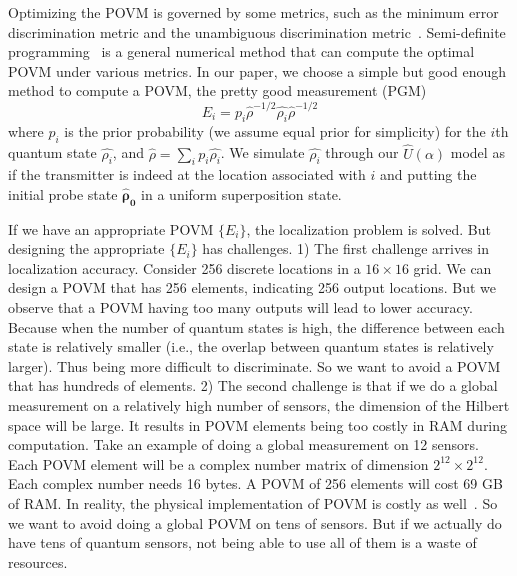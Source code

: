 Optimizing the POVM is governed by some metrics, such as the minimum error discrimination metric and the unambiguous discrimination metric~\cite{bergou2004}.
Semi-definite programming~\cite{semidefinite} is a general numerical method that can compute the optimal POVM under various metrics.
In our paper, we choose a simple but good enough method to compute a POVM, the pretty good measurement (PGM)~\cite{prettygood}
\begin{equation}
    E_i = p_i \hat{\rho}^{-1/2} \hat{\rho_i} \hat{\rho}^{-1/2}
\end{equation}
where $p_i$ is the prior probability (we assume equal prior for simplicity) for the $i$th quantum state $\hat{\rho_i}$, and $\hat{\rho} = \sum_{i} p_i \hat{\rho_i}$. 
We simulate $\hat{\rho_i}$ through our $\hat{U}(\alpha)$ model as if the transmitter is indeed at the location associated with $i$ and putting the initial probe state $\boldsymbol{\hat{\rho}_0}$ in a uniform superposition state.

If we have an appropriate POVM $\{E_i\}$, the localization problem is solved.
But designing the appropriate $\{E_i\}$ has challenges.
1) The first challenge arrives in localization accuracy.
Consider 256 discrete locations in a $16\times16$ grid. 
We can design a POVM that has 256 elements, indicating 256 output locations.
But we observe that a POVM having too many outputs will lead to lower accuracy.
Because when the number of quantum states is high, the difference between each state is relatively smaller (i.e., the overlap between quantum states  is relatively larger). 
Thus being more difficult to discriminate.
So we want to avoid  a POVM that has hundreds of elements.
2) The second challenge is that if we do a global measurement on a relatively high number of sensors, the dimension of the Hilbert space will be large.
It results in POVM elements being too costly in RAM during computation.
Take an example of doing a global measurement on 12 sensors.
Each POVM element will be a complex number matrix of dimension $2^{12} \times 2^{12}$.
Each complex number needs 16 bytes.
A POVM of 256 elements will cost 69 GB of RAM.
In reality, the physical implementation of POVM is costly as well~\cite{pra19-povm}.
So we want to avoid doing a global POVM on tens of sensors.
But if we actually do have tens of quantum sensors, not being able to use all of them is a waste of resources.


